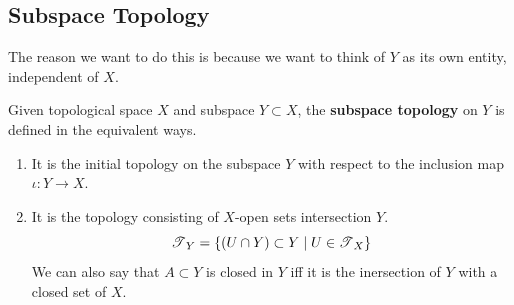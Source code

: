 \subsection{Subspace Topology} 

  The reason we want to do this is because we want to think of $Y$ as its own entity, independent of $X$. 

  \begin{definition}
    Given topological space $X$ and subspace $Y \subset X$, the \textbf{subspace topology} on $Y$ is defined in the equivalent ways. 
    \begin{enumerate}
      \item It is the initial topology on the subspace $Y$ with respect to the inclusion map $\iota: Y \rightarrow X$. 
      \item It is the topology consisting of $X$-open sets intersection $Y$.
      \begin{equation}
        \T_Y = \{(U \cap Y) \subset Y \mid U \in \T_X\}
      \end{equation}
      We can also say that $A \subset Y$ is closed in $Y$ iff it is the inersection of $Y$ with a closed set of $X$. 
    \end{enumerate}

    \begin{figure}[H]
      \centering
      \begin{subfigure}[b]{0.48\textwidth}
        \centering
\end{subfigure}
\end{figure}
\end{definition}

